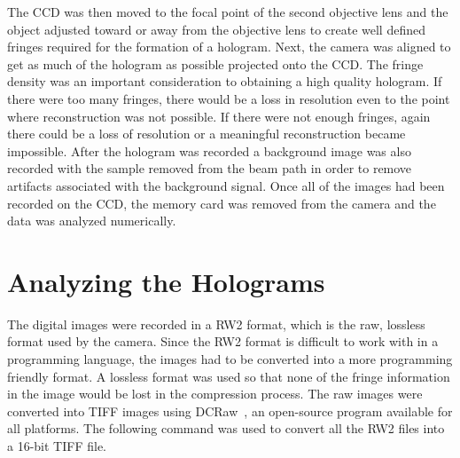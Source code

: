 The CCD was then moved to the focal point of the second objective
lens
%
and the object adjusted toward or away from the objective lens to create well
defined fringes
required for the formation of a hologram.
Next, the camera was aligned to get as much of the
hologram as possible projected onto the CCD\@. The fringe density was an
important consideration to obtaining a high quality hologram.
If there were too many fringes,
there would be a loss in resolution even to the point
where reconstruction was not possible. 
If there were not enough fringes, again there could be a loss of
resolution or a meaningful reconstruction became impossible. 
After the hologram was recorded a
background image was also recorded with the sample removed from the beam path
in order to remove artifacts associated with the background signal.
Once all of the images had been recorded on the
CCD, the memory card was removed from the camera and the data was analyzed numerically.

\section{Analyzing the Holograms}

The digital images were recorded in a RW2 format, which is the raw,
lossless format used by the camera.
Since the RW2 format is difficult to work with in a programming language,
the images had to be converted into a more programming friendly format.
A lossless format was used so that none of the fringe information in the image
would be lost in the compression process. 
The raw images were converted into TIFF images using DCRaw~\cite{DCRaw},
an
open-source program available for all platforms. The following command was
used to convert all the RW2 files into a 16-bit TIFF file.


